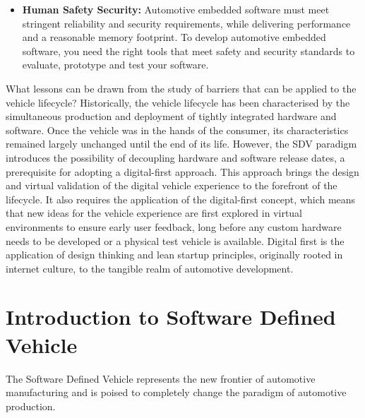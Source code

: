 \begin{itemize}
    \item \textbf{Human Safety Security:} Automotive embedded software must meet stringent reliability and security requirements, while delivering performance and a reasonable memory footprint. To develop automotive embedded software, you need the right tools that meet safety and security standards to evaluate, prototype and test your software.
\end{itemize}

What lessons can be drawn from the study of barriers that can be applied to the vehicle lifecycle? Historically, the vehicle lifecycle has been characterised by the simultaneous production and deployment of tightly integrated hardware and software. Once the vehicle was in the hands of the consumer, its characteristics remained largely unchanged until the end of its life. However, the SDV paradigm introduces the possibility of decoupling hardware and software release dates, a prerequisite for adopting a digital-first approach. This approach brings the design and virtual validation of the digital vehicle experience to the forefront of the lifecycle.
It also requires the application of the digital-first concept, which means that new ideas for the vehicle experience are first explored in virtual environments to ensure early user feedback, long before any custom hardware needs to be developed or a physical test vehicle is available. Digital first is the application of design thinking and lean startup principles, originally rooted in internet culture, to the tangible realm of automotive development.


\section{Introduction to Software Defined Vehicle}
The Software Defined Vehicle represents the new frontier of automotive manufacturing and is poised to completely change the paradigm of automotive production. 

